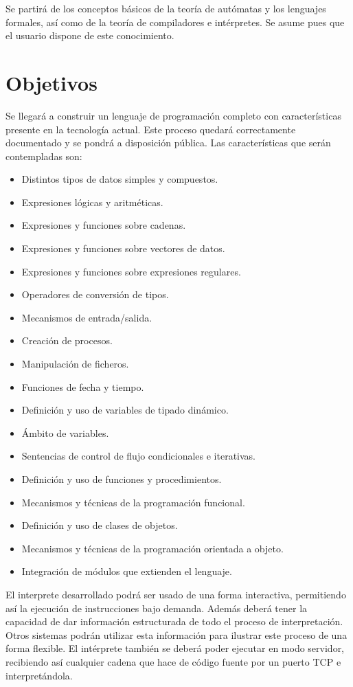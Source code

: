 Se partirá de los conceptos básicos de la teoría de autómatas y los lenguajes formales, así como de la teoría de compiladores e intérpretes. Se asume pues que el usuario dispone
de este conocimiento.

\section{Objetivos}
Se llegará a construir un lenguaje de programación completo con características presente en la tecnología actual. Este proceso quedará correctamente documentado y se pondrá a disposición pública.
Las características que serán contempladas son:

\begin{itemize}
\item Distintos tipos de datos simples y compuestos.
\item Expresiones lógicas y aritméticas.
\item Expresiones y funciones sobre cadenas.
\item Expresiones y funciones sobre vectores de datos.
\item Expresiones y funciones sobre expresiones regulares.
\item Operadores de conversión de tipos.
\item Mecanismos de entrada/salida.
\item Creación de procesos.
\item Manipulación de ficheros.
\item Funciones de fecha y tiempo.
\item Definición y uso de variables de tipado dinámico.
\item Ámbito de variables.
\item Sentencias de control de flujo condicionales e iterativas.
\item Definición y uso de funciones y procedimientos.
\item Mecanismos y técnicas de la programación funcional.
\item Definición y uso de clases de objetos.
\item Mecanismos y técnicas de la programación orientada a objeto.
\item Integración de módulos que extienden el lenguaje.
\end{itemize}

El interprete desarrollado podrá ser usado de una forma interactiva, permitiendo así la ejecución de
instrucciones bajo demanda. Además deberá tener la capacidad de dar información
estructurada de todo el proceso de interpretación. Otros sistemas podrán utilizar
esta información para ilustrar este proceso de una forma flexible. El intérprete también 
se deberá poder ejecutar en modo servidor, recibiendo así cualquier cadena que hace de código fuente por un puerto TCP e interpretándola.  


